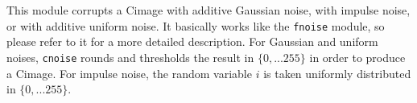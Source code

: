 This module corrupts a Cimage with additive Gaussian noise,
with impulse noise, or with additive uniform noise. 
It basically works like the \verb+fnoise+ 
module, so please refer to it for a more detailed description. 
For Gaussian and uniform noises, \verb+cnoise+
rounds and thresholds the result in $\{0,...255\}$ in order to produce 
a Cimage. For impulse noise, the random variable $i$ 
is taken uniformly distributed in $\{0,...255\}$.
